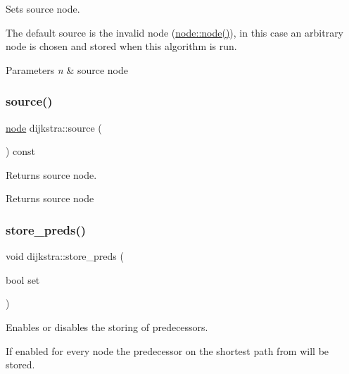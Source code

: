Sets source node. 

The default source is the invalid node (\mbox{\hyperlink{classnode_ad603259398d5667e3b97a6322a2bcc20}{node\+::node()}}), in this case an arbitrary node is chosen and stored when this algorithm is run.


\begin{DoxyParams}{Parameters}
{\em n} & source node \\
\hline
\end{DoxyParams}
\mbox{\label{classdijkstra_a69772d19321b5e4deac66174ec546caa}} 
\subsubsection{\texorpdfstring{source()}{source()}\hspace{0.1cm}{\footnotesize\ttfamily [2/2]}}
{\footnotesize\ttfamily \mbox{\hyperlink{classnode}{node}} dijkstra\+::source (\begin{DoxyParamCaption}{ }\end{DoxyParamCaption}) const}



Returns source node. 

\begin{DoxyReturn}{Returns}
source node 
\end{DoxyReturn}
\mbox{\label{classdijkstra_af79383dbbb6b737afcefd8e32350192d}} 
\subsubsection{\texorpdfstring{store\+\_\+preds()}{store\_preds()}\hspace{0.1cm}{\footnotesize\ttfamily [1/2]}}
{\footnotesize\ttfamily void dijkstra\+::store\+\_\+preds (\begin{DoxyParamCaption}\item[{bool}]{set }\end{DoxyParamCaption})}



Enables or disables the storing of predecessors. 

If enabled for every node the predecessor on the shortest path from will be stored.


